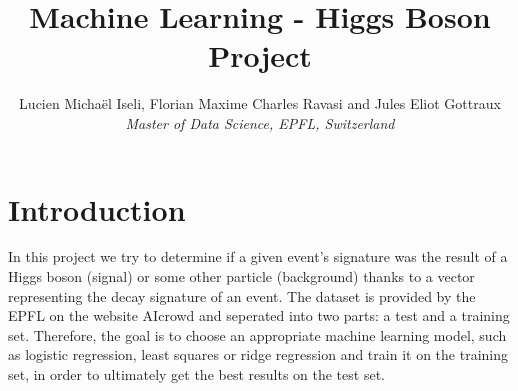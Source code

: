 \documentclass[10pt,conference,compsocconf]{IEEEtran}
\begin{document}
\title{Machine Learning - Higgs Boson Project}

\author{
  Lucien Michaël Iseli, Florian Maxime Charles Ravasi and Jules Eliot Gottraux\\
  \textit{Master of Data Science, EPFL, Switzerland}
}

\maketitle

\section{Introduction}
In this project we try to determine if a given event's signature was the result of a Higgs boson (signal) or some other particle (background) thanks to a vector representing the decay signature of an event. The dataset is provided by the EPFL on the website AIcrowd and seperated into two parts: a test and a training set. Therefore, the goal is to choose an appropriate machine learning model, such as logistic regression, least squares or ridge regression and train it on the training set, in order to ultimately get the best results on the test set.
\end{document}
